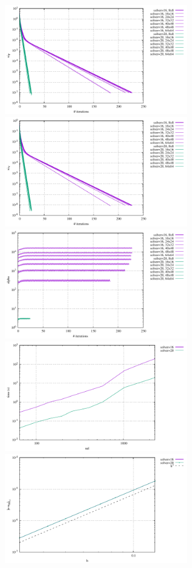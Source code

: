 \begin{center}
\includegraphics[width=8cm]{python_codes/fieldstone_147/RESULTS/L2/uzawa2/solver_convergence_P.pdf}
\includegraphics[width=8cm]{python_codes/fieldstone_147/RESULTS/L2/uzawa2/solver_convergence_V.pdf} \\
\includegraphics[width=8cm]{python_codes/fieldstone_147/RESULTS/L2/uzawa2/solver_convergence_alpha.pdf}
\includegraphics[width=8cm]{python_codes/fieldstone_147/RESULTS/L2/uzawa2/time.pdf}\\
\includegraphics[width=8cm]{python_codes/fieldstone_147/RESULTS/L2/uzawa2/errorsV.pdf}

\end{center}
